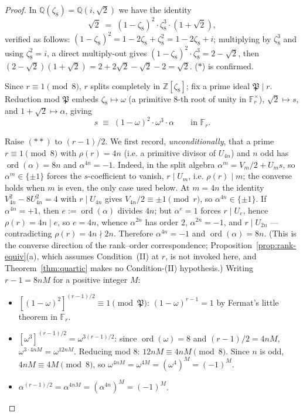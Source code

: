 \documentclass[11pt]{amsart}
\theoremstyle{plain}
\theoremstyle{definition}
\theoremstyle{remark}
\numberwithin{equation}{section}
\newcommand{\ord}{\operatorname{ord}}
\newcommand{\Z}{\mathbb{Z}}
\newcommand{\Q}{\mathbb{Q}}
\newcommand{\F}{\mathbb{F}}
\begin{document}
\begin{proof}
In $\Q(\zeta_8) = \Q(i, \sqrt 2)$ we have the identity
\begin{equation*}
  \sqrt 2 \;=\; (1 - \zeta_8)^2 \cdot \zeta_8^3 \cdot (1 + \sqrt 2), \tag{$\ast$}
\end{equation*}
verified as follows: $(1 - \zeta_8)^2 = 1 - 2 \zeta_8 + \zeta_8^2 = 1 - 2 \zeta_8 + i$; multiplying by $\zeta_8^3$ and using $\zeta_8^2 = i$, a direct multiply-out gives $(1 - \zeta_8)^2 \cdot \zeta_8^3 = 2 - \sqrt 2$, then $(2 - \sqrt 2)(1 + \sqrt 2) = 2 + 2\sqrt 2 - \sqrt 2 - 2 = \sqrt 2$. ($\ast$) is confirmed.

Since $r \equiv 1 \pmod 8$, $r$ splits completely in $\Z[\zeta_8]$; fix a prime ideal $\mathfrak{P} \mid r$. Reduction mod $\mathfrak{P}$ embeds $\zeta_8 \mapsto \omega$ (a primitive 8-th root of unity in $\F_r^\times$), $\sqrt 2 \mapsto s$, and $1 + \sqrt 2 \mapsto \alpha$, giving
\begin{equation*}
  s \;\equiv\; (1 - \omega)^2 \cdot \omega^3 \cdot \alpha \qquad\text{in } \F_r. \tag{$\ast\ast$}
\end{equation*}

Raise $(\ast\ast)$ to $(r-1)/2$. We first record, \emph{unconditionally}, that a prime $r \equiv 1 \pmod 8$ with $\rho(r) = 4 n$ (i.e. a primitive divisor of $U_{4n}$) and $n$ odd has $\ord(\alpha) = 8 n$ and $\alpha^{4n} = -1$. Indeed, in the split algebra $\alpha^m = V_m/2 + U_m s$, so $\alpha^m \in \{\pm 1\}$ forces the $s$-coefficient to vanish, $r \mid U_m$, i.e. $\rho(r) \mid m$; the converse holds when $m$ is even, the only case used below. At $m = 4 n$ the identity $V_{4n}^2 - 8 U_{4n}^2 = 4$ with $r \mid U_{4n}$ gives $V_{4n}/2 \equiv \pm 1 \pmod r$, so $\alpha^{4n} \in \{\pm 1\}$. If $\alpha^{4n} = +1$, then $e := \ord(\alpha)$ divides $4 n$; but $\alpha^e = 1$ forces $r \mid U_e$, hence $\rho(r) = 4 n \mid e$, so $e = 4 n$, whence $\alpha^{2n}$ has order $2$, $\alpha^{2n} = -1$, and $r \mid U_{2n}$ --- contradicting $\rho(r) = 4 n \nmid 2 n$. Therefore $\alpha^{4n} = -1$ and $\ord(\alpha) = 8 n$. (This is the converse direction of the rank--order correspondence; Proposition~\ref{prop:rank-equiv}(a), which assumes Condition~(II) at $r$, is not invoked here, and Theorem~\ref{thm:quartic} makes no Condition-(II) hypothesis.) Writing $r - 1 = 8 n M$ for a positive integer $M$:

\begin{itemize}
\item $[(1 - \omega)^2]^{(r-1)/2} \equiv 1 \pmod{\mathfrak{P}}$: $(1 - \omega)^{r-1} = 1$ by Fermat's little theorem in $\F_r$.
\item $[\omega^3]^{(r-1)/2} = \omega^{3(r-1)/2}$: since $\ord(\omega) = 8$ and $(r-1)/2 = 4 n M$, $\omega^{3 \cdot 4 n M} = \omega^{12 n M}$. Reducing mod 8: $12 n M \equiv 4 n M \pmod 8$. Since $n$ is odd, $4 n M \equiv 4 M \pmod 8$, so $\omega^{4 n M} = \omega^{4 M} = (\omega^4)^M = (-1)^M$.
\item $\alpha^{(r-1)/2} = \alpha^{4 n M} = (\alpha^{4n})^M = (-1)^M$.
\end{itemize}


\end{proof}
\end{document}
